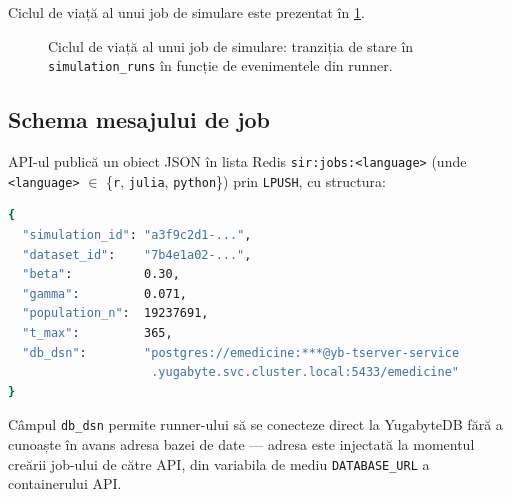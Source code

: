 Ciclul de viață al unui job de simulare este prezentat în
\cref{fig:job_lifecycle}.

\begin{figure}[htbp]
\centering
{}
\caption{Ciclul de viață al unui job de simulare: tranziția de stare în
\texttt{simulation\_runs} în funcție de evenimentele din runner.}
\label{fig:job_lifecycle}
\end{figure}

\subsection{Schema mesajului de job}
\label{subsec:job_schema}

API-ul publică un obiect JSON în lista Redis \texttt{sir:jobs:<language>}
(unde \texttt{<language>} $\in$ \{\texttt{r}, \texttt{julia}, \texttt{python}\})
prin \texttt{LPUSH}, cu structura:

\begin{lstlisting}[language=bash, caption={Structura mesajului JSON de job publicat de API în coada Redis.}]
{
  "simulation_id": "a3f9c2d1-...",
  "dataset_id":    "7b4e1a02-...",
  "beta":          0.30,
  "gamma":         0.071,
  "population_n":  19237691,
  "t_max":         365,
  "db_dsn":        "postgres://emedicine:***@yb-tserver-service
                    .yugabyte.svc.cluster.local:5433/emedicine"
}
\end{lstlisting}

Câmpul \texttt{db\_dsn} permite runner-ului să se conecteze direct la
YugabyteDB fără a cunoaște în avans adresa bazei de date --- adresa este
injectată la momentul creării job-ului de către API, din variabila de mediu
\texttt{DATABASE\_URL} a containerului API.

